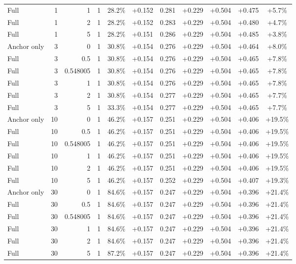 \begin{table}[htbp]
\begin{tabular}{lrrrccccccc}
Full & 1 & 1 & 1 & 28.2\% & +0.152 & 0.281 & +0.229 & +0.504 & +0.475 & +5.7\% \\
Full & 1 & 2 & 1 & 28.2\% & +0.152 & 0.283 & +0.229 & +0.504 & +0.480 & +4.7\% \\
Full & 1 & 5 & 1 & 28.2\% & +0.151 & 0.286 & +0.229 & +0.504 & +0.485 & +3.8\% \\
Anchor only & 3 & 0 & 1 & 30.8\% & +0.154 & 0.276 & +0.229 & +0.504 & +0.464 & +8.0\% \\
Full & 3 & 0.5 & 1 & 30.8\% & +0.154 & 0.276 & +0.229 & +0.504 & +0.465 & +7.8\% \\
Full & 3 & 0.548005 & 1 & 30.8\% & +0.154 & 0.276 & +0.229 & +0.504 & +0.465 & +7.8\% \\
Full & 3 & 1 & 1 & 30.8\% & +0.154 & 0.276 & +0.229 & +0.504 & +0.465 & +7.8\% \\
Full & 3 & 2 & 1 & 30.8\% & +0.154 & 0.277 & +0.229 & +0.504 & +0.465 & +7.7\% \\
Full & 3 & 5 & 1 & 33.3\% & +0.154 & 0.277 & +0.229 & +0.504 & +0.465 & +7.7\% \\
Anchor only & 10 & 0 & 1 & 46.2\% & +0.157 & 0.251 & +0.229 & +0.504 & +0.406 & +19.5\% \\
Full & 10 & 0.5 & 1 & 46.2\% & +0.157 & 0.251 & +0.229 & +0.504 & +0.406 & +19.5\% \\
Full & 10 & 0.548005 & 1 & 46.2\% & +0.157 & 0.251 & +0.229 & +0.504 & +0.406 & +19.5\% \\
Full & 10 & 1 & 1 & 46.2\% & +0.157 & 0.251 & +0.229 & +0.504 & +0.406 & +19.5\% \\
Full & 10 & 2 & 1 & 46.2\% & +0.157 & 0.251 & +0.229 & +0.504 & +0.406 & +19.5\% \\
Full & 10 & 5 & 1 & 46.2\% & +0.157 & 0.252 & +0.229 & +0.504 & +0.407 & +19.3\% \\
Anchor only & 30 & 0 & 1 & 84.6\% & +0.157 & 0.247 & +0.229 & +0.504 & +0.396 & +21.4\% \\
Full & 30 & 0.5 & 1 & 84.6\% & +0.157 & 0.247 & +0.229 & +0.504 & +0.396 & +21.4\% \\
Full & 30 & 0.548005 & 1 & 84.6\% & +0.157 & 0.247 & +0.229 & +0.504 & +0.396 & +21.4\% \\
Full & 30 & 1 & 1 & 84.6\% & +0.157 & 0.247 & +0.229 & +0.504 & +0.396 & +21.4\% \\
Full & 30 & 2 & 1 & 84.6\% & +0.157 & 0.247 & +0.229 & +0.504 & +0.396 & +21.4\% \\
Full & 30 & 5 & 1 & 87.2\% & +0.157 & 0.247 & +0.229 & +0.504 & +0.396 & +21.4\% \\

\end{tabular}
\end{table}
